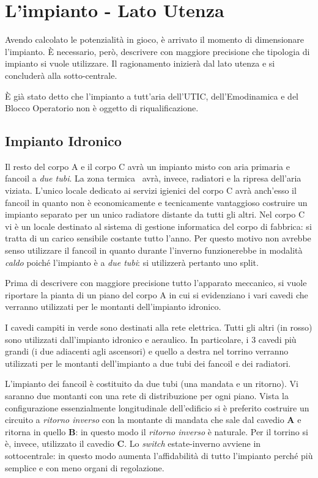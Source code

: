 \section{L'impianto - Lato Utenza}
Avendo calcolato le potenzialità in gioco, è arrivato il momento di dimensionare l'impianto. È necessario, però, descrivere con maggiore precisione che tipologia di impianto si vuole utilizzare. Il ragionamento inizierà dal lato utenza e si concluderà alla sotto-centrale.

È già stato detto che l'impianto a tutt'aria dell'UTIC, dell'Emodinamica e del Blocco Operatorio non è oggetto di riqualificazione. 
\subsection{Impianto Idronico}
Il resto del corpo A e il corpo C avrà un impianto misto con aria primaria e fancoil a \emph{due tubi}. La zona termica \radd\ avrà, invece, radiatori e la ripresa dell'aria viziata. L'unico locale dedicato ai servizi igienici del corpo C avrà anch'esso il fancoil in quanto non è economicamente e tecnicamente vantaggioso costruire un impianto separato per un unico radiatore distante da tutti gli altri. Nel corpo C vi è un locale destinato al sistema di gestione informatica del corpo di fabbrica: si tratta di un carico sensibile costante tutto l'anno. Per questo motivo non avrebbe senso utilizzare il fancoil in quanto durante l'inverno funzionerebbe in modalità \emph{caldo} poiché l'impianto è a \emph{due tubi}: si utilizzerà pertanto uno split. 

Prima di descrivere con maggiore precisione tutto l'apparato meccanico, si vuole riportare la pianta di un piano del corpo A in cui si evidenziano i vari cavedi che verranno utilizzati per le montanti dell'impianto idronico.

I cavedi campiti in verde sono destinati alla rete elettrica. Tutti gli altri (in rosso) sono utilizzati dall'impianto idronico e aeraulico. In particolare, i 3 cavedi più grandi (i due adiacenti agli ascensori) e quello a destra nel torrino verranno utilizzati per le montanti dell'impianto a due tubi dei fancoil e dei radiatori. 

L'impianto dei fancoil è costituito da due tubi (una mandata e un ritorno). Vi saranno due montanti con una rete di distribuzione per ogni piano. Vista la configurazione essenzialmente longitudinale dell'edificio si è preferito costruire un circuito a \emph{ritorno inverso} con la montante di mandata che sale dal cavedio \textbf{A} e ritorna in quello \textbf{B}: in questo modo il \emph{ritorno inverso} è naturale. Per il torrino si è, invece, utilizzato il cavedio \textbf{C}. Lo \emph{switch} estate-inverno avviene in sottocentrale: in questo modo aumenta l'affidabilità di tutto l'impianto perché più semplice e con meno organi di regolazione.

